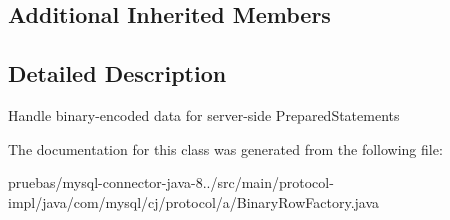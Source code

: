 \subsection*{Additional Inherited Members}


\subsection{Detailed Description}
Handle binary-\/encoded data for server-\/side Prepared\+Statements 

The documentation for this class was generated from the following file\+:\begin{DoxyCompactItemize}
\item 
pruebas/mysql-\/connector-\/java-\/8../src/main/protocol-\/impl/java/com/mysql/cj/protocol/a/Binary\+Row\+Factory.\+java\end{DoxyCompactItemize}

